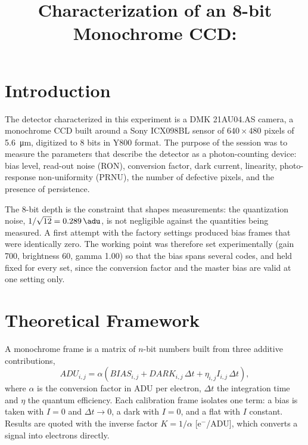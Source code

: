 \documentclass[conference]{IEEEtran}
\begin{document}
\title{Characterization of an 8-bit Monochrome CCD:\\}

\author{
}

\maketitle

\section{Introduction}

The detector characterized in this experiment is a DMK 21AU04.AS camera, a monochrome CCD built around a Sony ICX098BL sensor of $640 \times 480$ pixels of \SI{5.6}{\micro\meter}, digitized to 8 bits in Y800 format. The purpose of the session was to measure the parameters that describe the detector as a photon-counting device: bias level, read-out noise (RON), conversion factor, dark current, linearity, photo-response non-uniformity (PRNU), the number of defective pixels, and the presence of persistence\cite{guide}.

The 8-bit depth is the constraint that shapes measurements: the quantization noise, $1/\sqrt{12} = \SI{0.289}{\adu}$, is not negligible against the quantities being measured. A first attempt with the factory settings produced bias frames that were identically zero. The working point was therefore set experimentally (gain 700, brightness 60, gamma 1.00) so that the bias spans several codes, and held fixed for every set, since the conversion factor and the master bias are valid at one setting only.

\section{Theoretical Framework}
\label{sec:theory}

A monochrome frame is a matrix of $n$-bit numbers built from three additive contributions\cite{guide},
\begin{equation}
ADU_{i,j} = \alpha \left( BIAS_{i,j} + DARK_{i,j}\,\Delta t
+ \eta_{i,j} I_{i,j}\,\Delta t \right),
\label{eq:model}
\end{equation}
where $\alpha$ is the conversion factor in ADU per electron, $\Delta t$ the integration time and $\eta$ the quantum efficiency. Each calibration frame isolates one term: a bias is taken with $I = 0$ and $\Delta t \to 0$, a dark with $I = 0$, and a flat with $I$ constant. Results are quoted with the inverse factor $K = 1/\alpha$ [e$^-$/ADU], which converts a signal into electrons directly.
\end{document}
